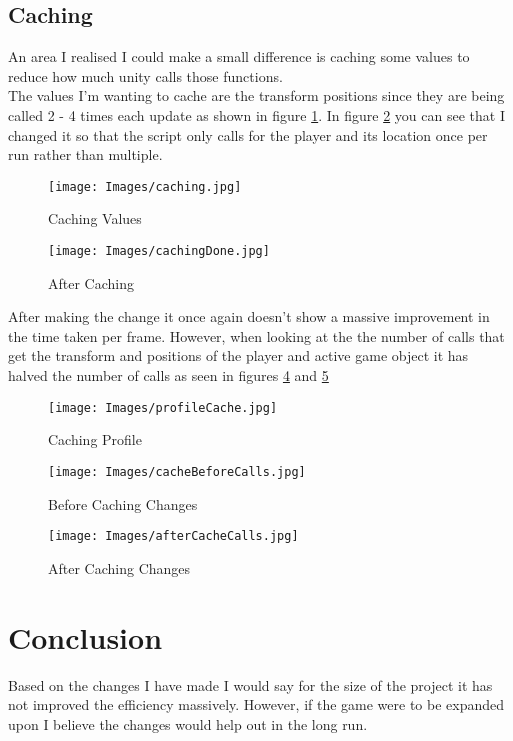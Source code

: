 \documentclass{article}
\begin{document}
\subsection{Caching}

An area I realised I could make a small difference is caching some values to reduce how much unity calls those functions.\\
\newline
The values I'm wanting to cache are the transform positions since they are being called 2 - 4 times each update as shown in figure \ref{fig:Caching}. In figure \ref{fig:CachingDone} you can see that I changed it so that the script only calls for the player and its location once per run rather than multiple.

\begin{figure}[!ht]
    \centering
    \texttt{[image: Images/caching.jpg]}
    \caption{Caching Values}
    \label{fig:Caching}
\end{figure}

\begin{figure}[!ht]
    \centering
    \texttt{[image: Images/cachingDone.jpg]}
    \caption{After Caching}
    \label{fig:CachingDone}
\end{figure}

After making the change it once again doesn't show a massive improvement in the time taken per frame. However, when looking at the the number of calls that get the transform and positions of the player and active game object it has halved the number of calls as seen in figures \ref{fig:beforeCalls} and \ref{fig:AfterCalls}

\begin{figure}[!ht]
    \centering
    \texttt{[image: Images/profileCache.jpg]}
    \caption{Caching Profile}
    \label{fig:Cache Profile}
\end{figure}

\begin{figure}[!ht]
    \centering
    \texttt{[image: Images/cacheBeforeCalls.jpg]}
    \caption{Before Caching Changes}
    \label{fig:beforeCalls}
\end{figure}

\begin{figure}[!ht]
    \centering
    \texttt{[image: Images/afterCacheCalls.jpg]}
    \caption{After Caching Changes}
    \label{fig:AfterCalls}
\end{figure}

\section{Conclusion}

Based on the changes I have made I would say for the size of the project it has not improved the efficiency massively. However, if the game were to be expanded upon I believe the changes would help out in the long run.

\typeout{}


\end{document}
